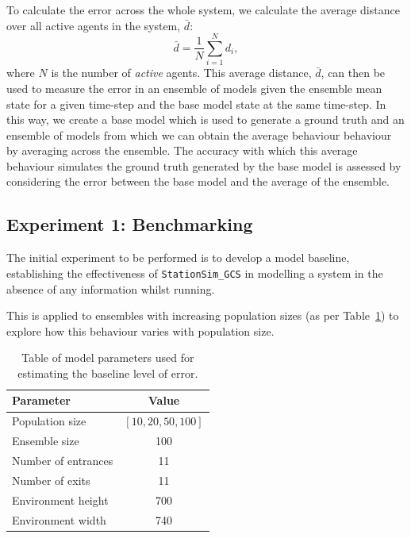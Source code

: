 \documentclass{article}
\begin{document}
To calculate the error across the whole system, we calculate the average distance over all active agents in the system, $\bar{d}$:
\begin{equation}
    \bar{d} = \frac{1}{N} \sum_{i=1}^{N} d_i,
\end{equation}
where $N$ is the number of \emph{active} agents. This average distance, $\bar{d}$, can then be used to measure the error in an ensemble of models given the ensemble mean state for a given time-step and the base model state at the same time-step. 
In this way, we create a base model which is used to generate a ground truth and an ensemble of models from which we can obtain the average behaviour behaviour by averaging across the ensemble. 
The accuracy with which this average behaviour simulates the ground truth generated by the base model is assessed by considering the error between the base model and the average of the ensemble.



\subsection{Experiment 1: Benchmarking}\label{sub:exp:bench}

The initial experiment to be performed is to develop a model baseline, establishing the effectiveness of \texttt{StationSim\_GCS} in modelling a system in the absence of any information whilst running. 

This is applied to ensembles with increasing population sizes (as per Table~\ref{tab:gcs_baseline_params}) to explore how this behaviour varies with population size.

\begin{table}
    \centering
    \begin{tabular}{@{}lc@{}}
        \toprule
        Parameter           & Value \\ \midrule
        Population size     & $[10, 20, 50, 100 ]$   \\
        Ensemble size       & 100   \\
        Number of entrances & 11    \\
        Number of exits     & 11    \\
        Environment height  & 700   \\
        Environment width   & 740   \\ \bottomrule
    \end{tabular}\caption{Table of model parameters used for estimating the
    baseline level of error.}\label{tab:gcs_baseline_params}
\end{table}
\end{document}
